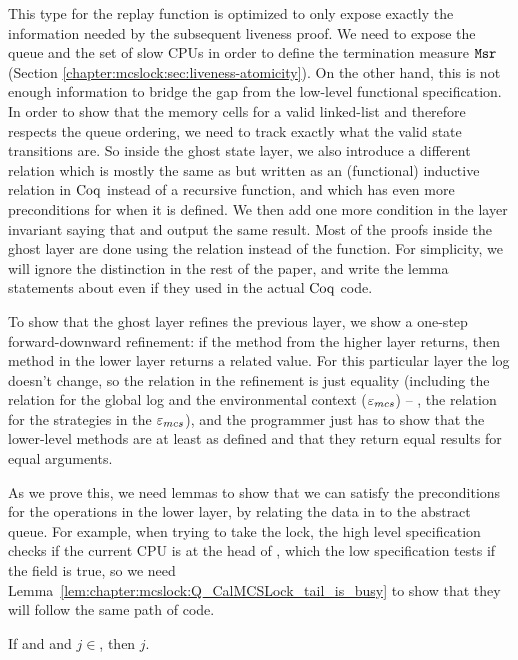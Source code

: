 This type for the replay function is optimized to only expose exactly the information needed by the subsequent liveness proof. 
We need to expose the queue and the set of slow CPUs in order to define the termination measure ${\mathrm{\texttt{Msr}}}$
 (Section \ref{chapter:mcslock:sec:liveness-atomicity}). 
 On the other hand, this is not enough information to bridge the gap from the low-level functional specification. 
 In order to show that the memory cells for a valid linked-list and therefore respects the queue
ordering, we need to track exactly what the valid state transitions are. So inside the ghost state layer, 
we also introduce a different relation   
which is mostly the same as  but written as an (functional) inductive relation 
in $\mathrm{Coq}$ instead of a recursive function, and which has even more preconditions for when it is defined. 
We then add one more condition in the layer invariant saying that  and  output the same
result. Most of the proofs inside the ghost layer are done using the relation instead of the function.
For simplicity, we will ignore the distinction in the rest of the paper, 
and write the lemma statements about  even if they used  in the actual $\mathrm{Coq}$ code.


To show that the ghost layer refines the previous layer, we show a
one-step forward-downward refinement: if the method from the higher
layer returns, then method in the lower layer returns a related
value. For this particular layer the log doesn't change, so the
relation in the refinement is just equality (including the relation for the global log and the environmental context (${\varepsilon}_{mcs}$) -- \ie, the relation for the strategies in the ${\varepsilon}_{mcs}$), 
and the programmer just
has to show that the lower-level methods are at least as defined and
that they return equal results for equal arguments.


As we prove this, we need lemmas to show that we can satisfy the preconditions for the operations in the lower layer, by relating the data in  to the abstract queue.  For example, when trying to take the lock, the high level specification checks if the current CPU is at the head of , which the low specification tests if the  field is true, so we need Lemma~\ref{lem:chapter:mcslock:Q_CalMCSLock_tail_is_busy} to show that they will follow the same path of code. 


\begin{lemma}
\label{lem:chapter:mcslock:Q_CalMCSLock_tail_is_busy}

    If  and 
     and $j \in$, then \code{lock$\_$array[}$j$\code{] = (true, $\_$)}.
\end{lemma}

